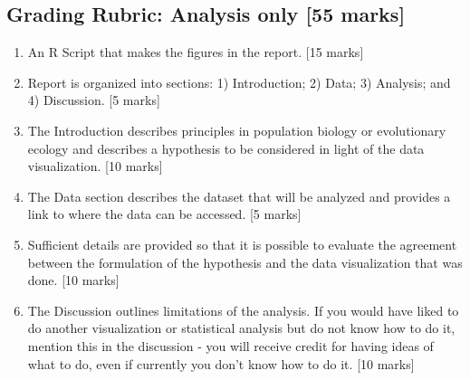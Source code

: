 \documentclass[]{book}
\begin{document}
\subsection{Grading Rubric: Analysis only {[}55
marks{]}}\label{grading-rubric-analysis-only-55-marks}

\begin{enumerate}
\def\labelenumi{\arabic{enumi}.}
\item
  An R Script that makes the figures in the report. {[}15 marks{]}
\item
  Report is organized into sections: 1) Introduction; 2) Data; 3)
  Analysis; and 4) Discussion. {[}5 marks{]}
\item
  The Introduction describes principles in population biology or
  evolutionary ecology and describes a hypothesis to be considered in
  light of the data visualization. {[}10 marks{]}
\item
  The Data section describes the dataset that will be analyzed and
  provides a link to where the data can be accessed. {[}5 marks{]}
\item
  Sufficient details are provided so that it is possible to evaluate the
  agreement between the formulation of the hypothesis and the data
  visualization that was done. {[}10 marks{]}
\item
  The Discussion outlines limitations of the analysis. If you would have
  liked to do another visualization or statistical analysis but do not
  know how to do it, mention this in the discussion - you will receive
  credit for having ideas of what to do, even if currently you don't
  know how to do it. {[}10 marks{]}
\end{enumerate}

\backmatter
\end{document}
